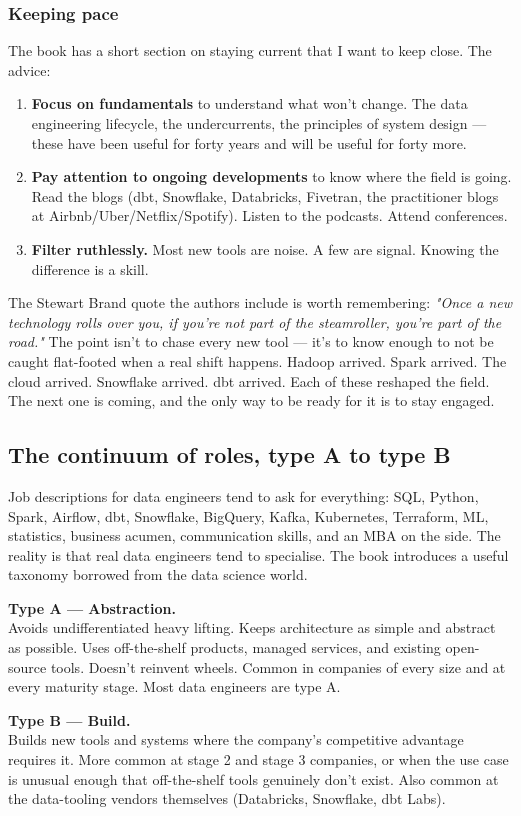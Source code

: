 \subsubsection{Keeping pace}

The book has a short section on staying current that I want to keep close. The advice:

\begin{enumerate}[leftmargin=*]
  \item \textbf{Focus on fundamentals} to understand what won't change. The data engineering lifecycle, the undercurrents, the principles of system design — these have been useful for forty years and will be useful for forty more.
  \item \textbf{Pay attention to ongoing developments} to know where the field is going. Read the blogs (dbt, Snowflake, Databricks, Fivetran, the practitioner blogs at Airbnb/Uber/Netflix/Spotify). Listen to the podcasts. Attend conferences.
  \item \textbf{Filter ruthlessly.} Most new tools are noise. A few are signal. Knowing the difference is a skill.
\end{enumerate}

The Stewart Brand quote the authors include is worth remembering: \emph{"Once a new technology rolls over you, if you're not part of the steamroller, you're part of the road."} The point isn't to chase every new tool — it's to know enough to not be caught flat-footed when a real shift happens. Hadoop arrived. Spark arrived. The cloud arrived. Snowflake arrived. dbt arrived. Each of these reshaped the field. The next one is coming, and the only way to be ready for it is to stay engaged.

\subsection{The continuum of roles, type A to type B}

Job descriptions for data engineers tend to ask for everything: SQL, Python, Spark, Airflow, dbt, Snowflake, BigQuery, Kafka, Kubernetes, Terraform, ML, statistics, business acumen, communication skills, and an MBA on the side. The reality is that real data engineers tend to specialise. The book introduces a useful taxonomy borrowed from the data science world.

\begin{defbox}
\textbf{Type A — Abstraction.}\\
Avoids undifferentiated heavy lifting. Keeps architecture as simple and abstract as possible. Uses off-the-shelf products, managed services, and existing open-source tools. Doesn't reinvent wheels. Common in companies of every size and at every maturity stage. Most data engineers are type A.

\textbf{Type B — Build.}\\
Builds new tools and systems where the company's competitive advantage requires it. More common at stage 2 and stage 3 companies, or when the use case is unusual enough that off-the-shelf tools genuinely don't exist. Also common at the data-tooling vendors themselves (Databricks, Snowflake, dbt Labs).
\end{defbox}

